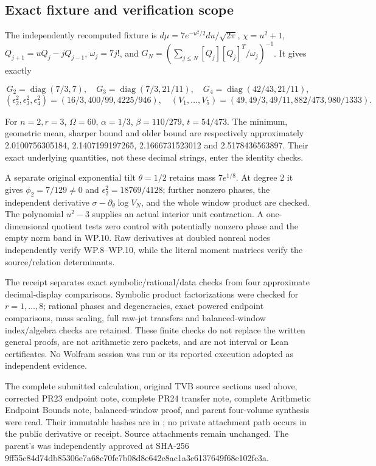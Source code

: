 \subsection[\hspace{0.4em}Exact fixture and verification scope]{Exact fixture and verification scope}\label{window-product-exact-fixture-and-verification-scope}

The independently recomputed fixture is \(d\mu=7e^{-u^2/2}du/\sqrt{2\pi}\), \(\chi=u^2+1\), \(Q_{j+1}=uQ_j-jQ_{j-1}\), \(\omega_j=7j!\), and \(G_N=(\sum_{j\le N}[Q_j][Q_j]^T/\omega_j)^{-1}\). It gives exactly

\[
G_2=\operatorname{diag}(7/3,7),\quad G_3=\operatorname{diag}(7/3,21/11),\quad
G_4=\operatorname{diag}(42/43,21/11),
\] \[
(\epsilon_2^2,\epsilon_3^2,\epsilon_4^2)=(16/3,400/99,4225/946),
\quad(V_1,\ldots,V_5)=(49,49/3,49/11,882/473,980/1333).
\]

For \(n=2,r=3\), \(\Omega=60\), \(\alpha=1/3\), \(\beta=110/279\), \(t=54/473\). The minimum, geometric mean, sharper bound and older bound are respectively approximately 2.0100756305184, 2.1407199197265, 2.1666731523012 and 2.5178436563897. Their exact underlying quantities, not these decimal strings, enter the identity checks.

A separate original exponential tilt \(\theta=1/2\) retains mass \(7e^{1/8}\). At degree 2 it gives \(\phi_2=7/129\ne0\) and \(\epsilon_2^2=18769/4128\); further nonzero phases, the independent derivative \(\sigma-\partial_\theta\log V_N\), and the whole window product are checked. The polynomial \(u^2-3\) supplies an actual interior unit contraction. A one-dimensional quotient tests zero control with potentially nonzero phase and the empty norm band in WP.10. Raw derivatives at doubled nonreal nodes independently verify WP.8--WP.10, while the literal moment matrices verify the source/relation determinants.

The receipt separates exact symbolic/rational/data checks from four approximate decimal-display comparisons. Symbolic product factorizations were checked for \(r=1,\ldots,8\); rational phases and degeneracies, exact powered endpoint comparisons, mass scaling, full raw-jet transfers and balanced-window index/algebra checks are retained. These finite checks do not replace the written general proofs, are not arithmetic zero packets, and are not interval or Lean certificates. No Wolfram session was run or its reported execution adopted as independent evidence.

The complete submitted calculation, original TVB source sections used above, corrected PR23 endpoint note, complete PR24 transfer note, complete Arithmetic Endpoint Bounds note, balanced-window proof, and parent four-volume synthesis were read. Their immutable hashes are in ; no private attachment path occurs in the public derivative or receipt. Source attachments remain unchanged. The parent's  was independently approved at SHA-256 {\ttfamily 9ff55c84\allowbreak{}d74db853\allowbreak{}06e7a68c\allowbreak{}70fe7b08\allowbreak{}d8e642e8\allowbreak{}ac1a3e61\allowbreak{}37649f68\allowbreak{}e102fc3a}.

